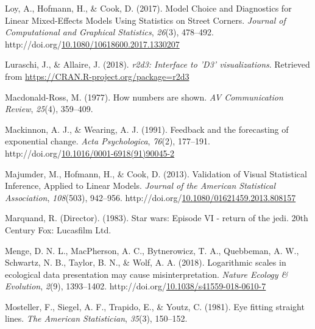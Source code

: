 \documentclass[print]{nuthesis}
\newlength{\cslhangindent}
\newenvironment{CSLReferences}%
{\setlength{\parindent}{0pt}%
\everypar{\setlength{\hangindent}{\cslhangindent}}\ignorespaces}%
{\par}
\begin{document}
\begin{CSLReferences}{1}{0}
\leavevmode{}%
Loy, A., Hofmann, H., \& Cook, D. (2017). Model {Choice} and {Diagnostics} for {Linear} {Mixed}-{Effects} {Models} {Using} {Statistics} on {Street} {Corners}. \emph{Journal of Computational and Graphical Statistics}, \emph{26}(3), 478--492. http://doi.org/\href{https://doi.org/10.1080/10618600.2017.1330207}{10.1080/10618600.2017.1330207}

\leavevmode{}%
Luraschi, J., \& Allaire, J. (2018). \emph{r2d3: Interface to 'D3' visualizations}. Retrieved from \url{https://CRAN.R-project.org/package=r2d3}

\leavevmode{}%
Macdonald-Ross, M. (1977). How numbers are shown. \emph{AV Communication Review}, \emph{25}(4), 359--409.

\leavevmode{}%
Mackinnon, A. J., \& Wearing, A. J. (1991). Feedback and the forecasting of exponential change. \emph{Acta Psychologica}, \emph{76}(2), 177--191. http://doi.org/\href{https://doi.org/10.1016/0001-6918(91)90045-2}{10.1016/0001-6918(91)90045-2}

\leavevmode{}%
Majumder, M., Hofmann, H., \& Cook, D. (2013). Validation of {Visual} {Statistical} {Inference}, {Applied} to {Linear} {Models}. \emph{Journal of the American Statistical Association}, \emph{108}(503), 942--956. http://doi.org/\href{https://doi.org/10.1080/01621459.2013.808157}{10.1080/01621459.2013.808157}

\leavevmode{}%
Marquand, R. (Director). (1983). Star wars: Episode VI - return of the jedi. 20th Century Fox: Lucasfilm Ltd.

\leavevmode{}%
Menge, D. N. L., MacPherson, A. C., Bytnerowicz, T. A., Quebbeman, A. W., Schwartz, N. B., Taylor, B. N., \& Wolf, A. A. (2018). Logarithmic scales in ecological data presentation may cause misinterpretation. \emph{Nature Ecology \& Evolution}, \emph{2}(9), 1393--1402. http://doi.org/\href{https://doi.org/10.1038/s41559-018-0610-7}{10.1038/s41559-018-0610-7}

\leavevmode{}%
Mosteller, F., Siegel, A. F., Trapido, E., \& Youtz, C. (1981). Eye fitting straight lines. \emph{The American Statistician}, \emph{35}(3), 150--152.


\end{CSLReferences}
\end{document}
